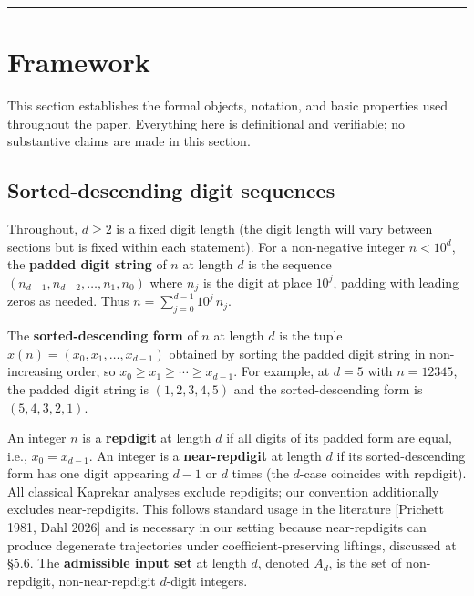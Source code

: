 \documentclass[11pt,letterpaper]{article}
\theoremstyle{paperstyle}
\theoremstyle{paperstyledef}
\theoremstyle{paperstylerem}
\begin{document}
\begin{center}\rule{0.5\linewidth}{0.5pt}\end{center}

\hypertarget{framework}{%
\section{Framework}\label{framework}}

This section establishes the formal objects, notation, and basic
properties used throughout the paper. Everything here is definitional
and verifiable; no substantive claims are made in this section.

\hypertarget{sorted-descending-digit-sequences}{%
\subsection{Sorted-descending digit sequences}\label{sorted-descending-digit-sequences}}

Throughout, \(d \geq 2\) is a fixed digit length (the digit length will
vary between sections but is fixed within each statement). For a
non-negative integer \(n < 10^d\), the \textbf{padded digit string} of
\(n\) at length \(d\) is the sequence
\((n_{d-1}, n_{d-2}, \ldots, n_1, n_0)\) where \(n_j\) is the digit at
place \(10^j\), padding with leading zeros as needed. Thus
\(n = \sum_{j = 0}^{d-1} 10^j \, n_j\).

The \textbf{sorted-descending form} of \(n\) at length \(d\) is the
tuple \(x(n) = (x_0, x_1, \ldots, x_{d-1})\) obtained by sorting the
padded digit string in non-increasing order, so
\(x_0 \geq x_1 \geq \cdots \geq x_{d-1}\). For example, at \(d = 5\)
with \(n = 12345\), the padded digit string is \((1, 2, 3, 4, 5)\) and
the sorted-descending form is \((5, 4, 3, 2, 1)\).

An integer \(n\) is a \textbf{repdigit} at length \(d\) if all digits of
its padded form are equal, i.e., \(x_0 = x_{d-1}\). An integer is a
\textbf{near-repdigit} at length \(d\) if its sorted-descending form has
one digit appearing \(d - 1\) or \(d\) times (the \(d\)-case coincides
with repdigit). All classical Kaprekar analyses exclude repdigits; our
convention additionally excludes near-repdigits. This follows standard
usage in the literature {[}Prichett 1981, Dahl 2026{]} and is necessary
in our setting because near-repdigits can produce degenerate
trajectories under coefficient-preserving liftings, discussed at §5.6.
The \textbf{admissible input set} at length \(d\), denoted \(A_d\), is
the set of non-repdigit, non-near-repdigit \(d\)-digit integers.
\end{document}
